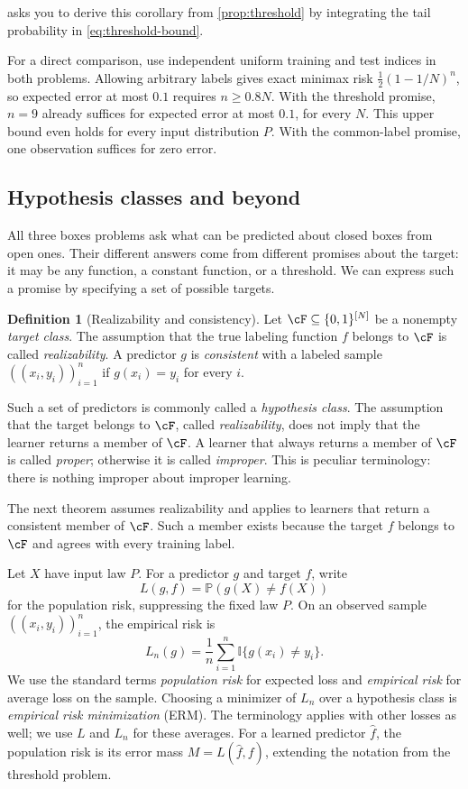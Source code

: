 \documentclass[11pt,twoside]{article}
\newcommand{\I}{\mathbb I}
\renewcommand{\P}{\mathbb P}
\theoremstyle{definition}
\newtheorem{definition}[theorem]{Definition}
\theoremstyle{remark}
\begin{document}
 asks you to derive this corollary from
\cref{prop:threshold} by integrating the tail probability in
\cref{eq:threshold-bound}.

For a direct comparison, use independent uniform training and test indices
in both problems. Allowing arbitrary labels gives exact minimax risk
$\tfrac12(1-1/N)^n$, so expected error at most $0.1$ requires $n\ge0.8N$.
With the threshold promise, $n=9$ already suffices for expected error at most
$0.1$, for every $N$. This upper bound even holds for every input distribution
$P$. With the common-label promise, one observation suffices for zero error.

\subsection{Hypothesis classes and beyond}
\label{sec:hypothesis-classes}

All three boxes problems ask what can be predicted about closed boxes from
open ones. Their different answers come from different promises about the
target: it may be any function, a constant function, or a threshold. We can
express such a promise by specifying a set of possible targets.

\begin{definition}[Realizability and consistency]
\label{def:realizability-consistency}
Let $\cF\subseteq\{0,1\}^{[N]}$ be a nonempty \emph{target class}.
The assumption that the true labeling function $f$ belongs to $\cF$ is
called \emph{realizability}. A predictor $g$ is \emph{consistent} with a
labeled sample $((x_i,y_i))_{i=1}^n$ if $g(x_i)=y_i$ for every $i$.
\end{definition}

Such a set of predictors is commonly called a \emph{hypothesis class}.
The assumption that the target belongs to $\cF$, called \emph{realizability},
does not imply that the learner returns a member of $\cF$. A learner that
always returns a member of $\cF$ is called \emph{proper}; otherwise it is
called \emph{improper}. This is peculiar terminology: there is nothing
improper about improper learning.

The next theorem assumes realizability and applies to learners that return
a consistent member of $\cF$. Such a member exists because the target $f$
belongs to $\cF$ and agrees with every training label.

Let $X$ have input law $P$. For a predictor $g$ and target $f$, write
\[
L(g,f)=\P(g(X)\ne f(X))
\]
for the population risk, suppressing the fixed law $P$. On an observed
sample $((x_i,y_i))_{i=1}^n$, the empirical risk is
\[
L_n(g)=\frac1n\sum_{i=1}^n\I\{g(x_i)\ne y_i\}.
\]
We use the standard terms \emph{population risk} for expected loss and
\emph{empirical risk} for average loss on the sample. Choosing a minimizer
of $L_n$ over a hypothesis class is \emph{empirical risk minimization}
(ERM). The terminology applies with other losses as well; we use $L$ and
$L_n$ for these averages.
For a learned predictor $\widehat f$, the population risk is its error
mass $M=L(\widehat f,f)$, extending the notation from the threshold problem.
\end{document}
